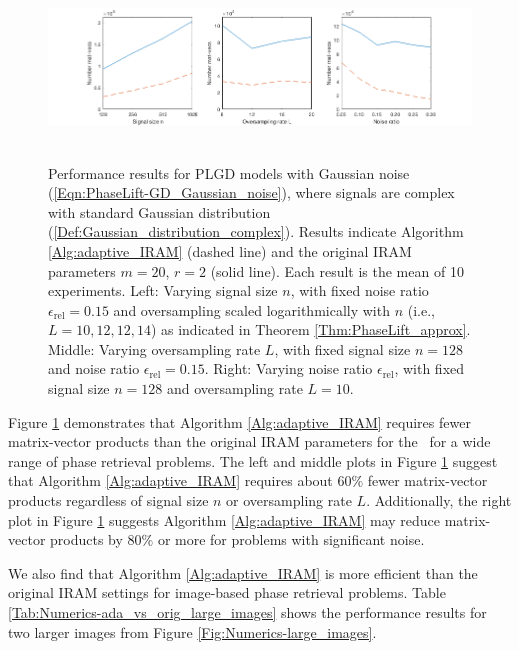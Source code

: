 \begin{figure}[H]
\centering
\hbox{\hspace{-1.8cm} 
	\includegraphics[scale=0.6]{Numerics-ada_vs_orig_various_params}
			}
	\vspace{0.0cm}
	\caption{
	Performance results for PLGD models with Gaussian noise (\ref{Eqn:PhaseLift-GD_Gaussian_noise}), where signals are complex with standard Gaussian distribution (\ref{Def:Gaussian_distribution_complex}).
	Results indicate Algorithm \ref{Alg:adaptive_IRAM} (dashed line) and the original IRAM parameters $m=20$, $r = 2$ (solid line). 
	Each result is the mean of 10 experiments.
	Left: Varying signal size $n$, with fixed noise ratio $\epsilon_\text{rel} = 0.15$ and oversampling scaled logarithmically with $n$ (i.e., $L = 10, 12, 12, 14$) as indicated in Theorem \ref{Thm:PhaseLift_approx}.
	Middle: Varying oversampling rate $L$, with fixed signal size $n = 128$ and noise ratio $\epsilon_\text{rel} = 0.15$.
	Right: Varying noise ratio $\epsilon_\text{rel}$, with fixed signal size $n = 128$ and oversampling rate $L = 10$.
	}
\label{Fig:Numerics-ada_vs_orig_various_params}
\end{figure}

Figure \ref{Fig:Numerics-ada_vs_orig_various_params} demonstrates that Algorithm \ref{Alg:adaptive_IRAM} requires fewer matrix-vector products than the original IRAM parameters for the \emep \ for a wide range of phase retrieval problems.
The left and middle plots in Figure \ref{Fig:Numerics-ada_vs_orig_various_params} suggest that Algorithm \ref{Alg:adaptive_IRAM} requires about $60\%$ fewer matrix-vector products regardless of signal size $n$ or oversampling rate $L$.
Additionally, the right plot in Figure \ref{Fig:Numerics-ada_vs_orig_various_params} suggests Algorithm \ref{Alg:adaptive_IRAM} may reduce matrix-vector products by $80\%$ or more for problems with significant noise.


We also find that Algorithm \ref{Alg:adaptive_IRAM} is more efficient than the original IRAM settings for image-based phase retrieval problems.
Table \ref{Tab:Numerics-ada_vs_orig_large_images} shows the performance results for two larger images from Figure \ref{Fig:Numerics-large_images}.



